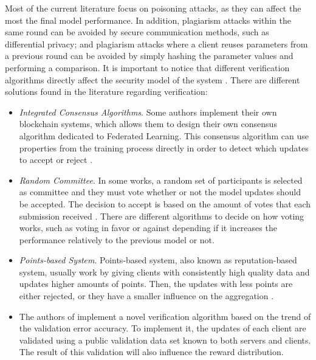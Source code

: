 Most of the current literature focus on poisoning attacks, as they can affect the most the final model performance. In addition, plagiarism attacks within the same round can be avoided by secure communication methods, such as differential privacy; and plagiarism attacks where a client reuses parameters from a previous round can be avoided by simply hashing the parameter values and performing a comparison. It is important to notice that different verification algorithms directly affect the security model of the system \cite{10.48550/arxiv.2110.02182}. There are different solutions found in the literature regarding verification:

\begin{itemize}
    \item \textit{Integrated Consensus Algorithms}. Some authors implement their own blockchain systems, which allows them to design their own consensus algorithm dedicated to Federated Learning. This consensus algorithm can use properties from the training process directly in order to detect which updates to accept or reject \cite{9293091, 10.1007/978-981-15-9213-3_12}.
    
    \item \textit{Random Committee}. In some works, a random set of participants is selected as committee and they must vote whether or not the model updates should be accepted. The decision to accept is based on the amount of votes that each submission received \cite{9159643}. There are different algorithms to decide on how voting works, such as voting in favor or against depending if it increases the performance relatively to the previous model or not.
    
    \item \textit{Points-based System}. Points-based system, also known as reputation-based system, usually work by giving clients with consistently high quality data and updates higher amounts of points. Then, the updates with less points are either rejected, or they have a smaller influence on the aggregation  \cite{10.48550/arxiv.2011.07516, 9170559, Peyvandi2022, 9292450}.
    
    \item The authors of \cite{8945913} implement a novel verification algorithm based on the trend of the validation error accuracy. To implement it, the updates of each client are validated using a public validation data set known to both servers and clients. The result of this validation will also influence the reward distribution.

\end{itemize}

